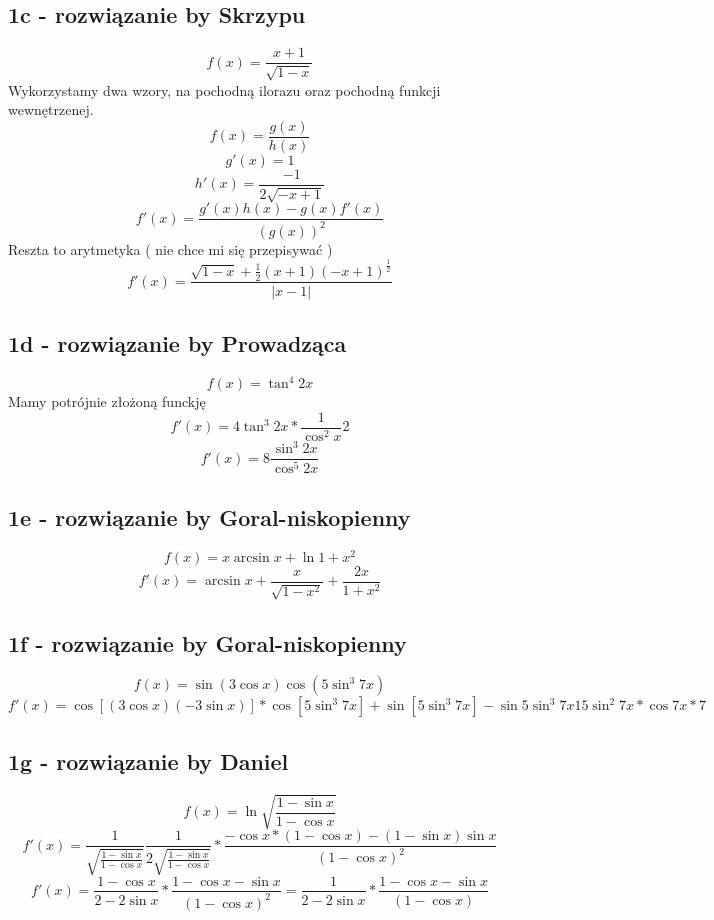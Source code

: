 \documentclass{article}
\begin{document}
\subsection{1c - rozwiązanie by Skrzypu}
$$f(x) = \frac{x+1}{\sqrt{1-x}} $$
Wykorzystamy dwa wzory, na pochodną ilorazu oraz pochodną funkcji wewnętrzenej.
$$f(x) = \frac{g(x)}{h(x)}$$
$$g'(x) = 1$$
$$h'(x) = \frac{-1}{2\sqrt{-x+1}} $$
$$f'(x) = \frac{g'(x)h(x) - g(x)f'(x)}{(g(x))^2}$$
Reszta to arytmetyka ( nie chce mi się przepisywać )
$$f'(x) = \frac{\sqrt{1-x} + \frac{1}{2}(x+1)(-x+1)^{\frac{1}{2}}}{|x-1|}$$

\subsection{1d - rozwiązanie by Prowadząca}
$$f(x) = \tan^4{2x} $$
Mamy potrójnie złożoną funckję
$$f'(x) = 4\tan^3{2x} * \frac{1}{\cos^2{x}} 2 $$
$$f'(x) = 8\frac{\sin^3{2x}}{\cos^5{2x}}$$

\subsection{1e - rozwiązanie by Goral-niskopienny}
$$f(x) = x\arcsin{x} + \ln{1+x^2} $$
$$f'(x) = \arcsin{x} + \frac{x}{\sqrt{1-x^2}} + \frac{2x}{1+x^2} $$

\subsection{1f - rozwiązanie by Goral-niskopienny}
$$f(x) = \sin{(3 \cos{x})}\cos{ (5 \sin^3{7x})} $$
$$f'(x) = \cos{[(3\cos{x})(-3\sin{x})]} * \cos{[5 \sin^3{7x}]} + \sin{[5\sin^3{7x}]} - \sin{5\sin^3{7x}}15\sin^2{7x}*\cos{7x}*7 $$

\subsection{1g - rozwiązanie by Daniel}
$$f(x) = \ln{\sqrt{\frac{1-\sin{x}}{1-\cos{x}}}} $$
$$f'(x) = \frac{1}{\sqrt{\frac{1-\sin{x}}{1-\cos{x}}}} \frac{1}{2\sqrt{\frac{1-\sin{x}}{1-\cos{x}}}} * \frac{-\cos{x} *(1-\cos{x}) - (1-\sin{x})\sin{x}}{(1-\cos{x})^2}$$
$$f'(x) = \frac{1-\cos{x}}{2-2\sin{x}} * \frac{1-\cos{x}-\sin{x}}{(1-\cos{x})^2} = \frac{1}{2-2\sin{x}} * \frac{1-\cos{x}-\sin{x}}{(1-\cos{x})}$$
\end{document}
